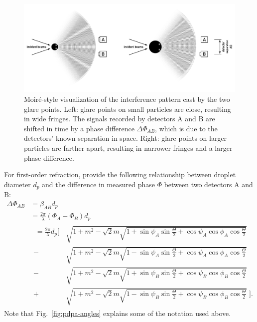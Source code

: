 \documentclass[11.5pt]{book}
\newcommand*{\figref}[1]{Fig.~\ref{#1}}
\begin{document}
\begin{figure}
    \centering
    \includegraphics[width=\textwidth]{img/setup/pdpa_moire_static.pdf}
    \caption{Moiré-style visualization of the interference pattern cast by the
    two glare points. Left: glare points on small particles are close, resulting
in wide fringes. The signals recorded by detectors A and B are shifted in time
by a phase difference $\Delta \Phi_{AB}$, which is due to the detectors' known
separation in space. Right: glare points on larger particles are farther apart,
resulting in narrower fringes and a larger phase difference.
\label{fig:pdpa-moire-static}}
\end{figure}

For first-order refraction, \citet{Albrecht03} provide the following
relationship between droplet diameter $d_p$ and the difference in measured
phase $\Phi$ between two detectors A and B:
\begin{equation}
    \begin{split}
        \Delta \Phi_{AB} &= \beta_{AB} d_p \\
                         &= \frac{2\pi}{\lambda} \left(\Phi_A - \Phi_B\right) d_p \\  
                         & 
        \begin{split}
            \;=\frac{2\pi}{\lambda} d_p \Bigg[\,&\sqrt{1+m^2-\sqrt{2} m
        \sqrt{1+\sin \psi_A \sin \frac{\Theta}{2} + \cos \psi_A \cos \phi_A \cos
    \frac{\Theta}{2}}} \\
        -{} &\sqrt{1+m^2-\sqrt{2} m \sqrt{1-\sin \psi_A \sin \frac{\Theta}{2} + \cos \psi_A \cos \phi_A \cos
    \frac{\Theta}{2}}}\\
        -{}&\sqrt{1+m^2-\sqrt{2} m \sqrt{1+\sin \psi_B \sin \frac{\Theta}{2} + \cos \psi_B \cos \phi_B \cos
    \frac{\Theta}{2}}}\\
    +{}&\sqrt{1+m^2-\sqrt{2} m \sqrt{1-\sin \psi_B \sin \frac{\Theta}{2} + \cos \psi_B \cos \phi_B \cos
    \frac{\Theta}{2}}}\; \Bigg]. \label{eq:pdpa-full}
\end{split}
    \end{split}
\end{equation}
Note that \figref{fig:pdpa-angles} explains some of the notation used above.
\end{document}
